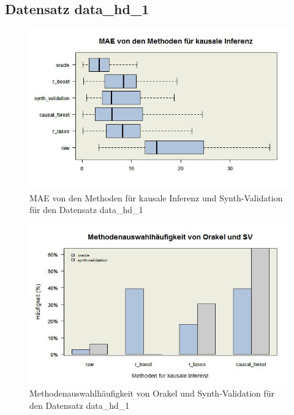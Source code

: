\documentclass[12pt,a4paper,twoside]{scrartcl}
\numberwithin{equation}{section}
\newcounter{mypagecount}%
\newenvironment{interlude}{%
  \clearpage
  \setcounter{mypagecount}{\value{page}}%
  \thispagestyle{empty}%
  \pagestyle{empty}%
}{%
  \clearpage
  \setcounter{page}{\value{mypagecount}}%
}
\begin{document}
\begin{interlude}
\begin{appendices}
\subsection{Datensatz data\_hd\_1}

\begin{center}
\begin{figure}[H]
    \centering
    \includegraphics[height=0.5\textwidth, width=1\textwidth]{figures/plots/appendix/generatedDataHD1Boxplot.jpeg}
    \caption[MAE von den Methoden für kausale Inferenz und Synth-Validation für den Datensatz data\_hd\_1]{MAE von den Methoden für kausale Inferenz und Synth-Validation für den Datensatz data\_hd\_1}
  \end{figure}
\end{center}

\begin{center}
\begin{figure}[H]
    \centering
    \includegraphics[height=0.5\textwidth, width=1\textwidth]{figures/plots/appendix/generatedDataHD1Barplot.jpeg}
    \caption[Methodenauswahlhäufigkeit von Orakel und Synth-Validation für den Datensatz data\_hd\_1]{Methodenauswahlhäufigkeit von Orakel und Synth-Validation für den Datensatz data\_hd\_1}
  \end{figure}
\end{center}


\end{appendices}
\end{interlude}
\end{document}
